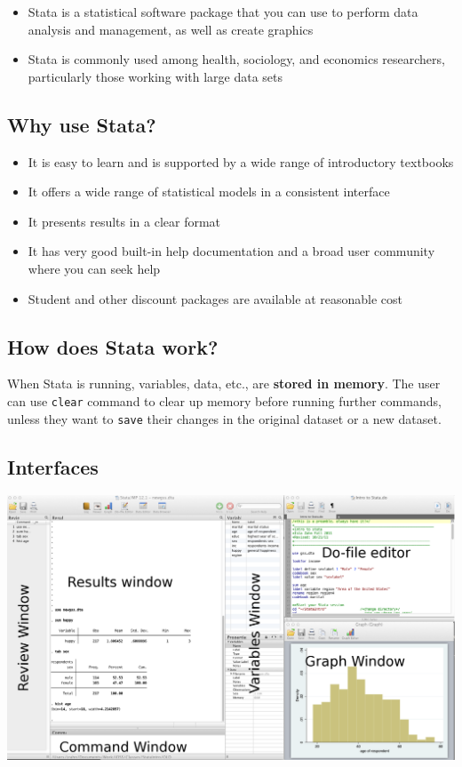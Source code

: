 \documentclass[
]{book}
\providecommand{\tightlist}{%
  \setlength{\itemsep}{0pt}\setlength{\parskip}{0pt}}
\begin{document}
\begin{itemize}
\tightlist
\item
  Stata is a statistical software package that you can use to perform data analysis and management, as well as create graphics
\item
  Stata is commonly used among health, sociology, and economics researchers, particularly those working with large data sets
\end{itemize}

\hypertarget{why-use-stata}{%
\subsection{Why use Stata?}\label{why-use-stata}}

\begin{itemize}
\tightlist
\item
  It is easy to learn and is supported by a wide range of introductory textbooks
\item
  It offers a wide range of statistical models in a consistent interface
\item
  It presents results in a clear format
\item
  It has very good built-in help documentation and a broad user community where you can seek help
\item
  Student and other discount packages are available at reasonable cost
\end{itemize}

\hypertarget{how-does-stata-work}{%
\subsection{How does Stata work?}\label{how-does-stata-work}}

When Stata is running, variables, data, etc., are \textbf{stored in memory}.
The user can use \texttt{clear} command to clear up memory before running further commands,
unless they want to \texttt{save} their changes in the original dataset or a new dataset.

\hypertarget{interfaces-2}{%
\subsection{Interfaces}\label{interfaces-2}}

\includegraphics{Stata/StataIntro/images/StataInterface.png}
\end{document}
